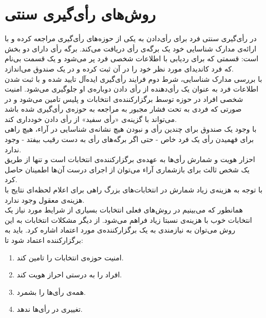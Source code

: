 \section{روش‌های رأی‌گیری سنتی}
\par
در رأی‌گیری سنتی فرد برای رأی‌دادن به یکی از ‌‌حوزه‌های رأی‌گیری مراجعه کرده و با ارائه‌ی مدارک شناسایی خود یک برگه‌ی رأی دریافت می‌کند. برگه رأی دارای دو بخش است: قسمتی که برای ردیابی با اطلاعات شخصی فرد پر می‌شود و یک قسمت بی‌نام که فرد کاندیدای مورد نظر خود را در آن ثبت کرده و در یک صندوق می‌اندازد. 
\\
با بررسی مدارک شناسایی، شرط دوم فرایند رأی‌گیری ایده‌آل تایید شده و با ثبت شدن اطلاعات فرد به عنوان یک رأی‌دهنده از رأی دادن دوباره‌ی او جلوگیری می‌شود. امنیت شخصی افراد در حوزه توسط برگزارکننده‌ی انتخابات و پلیس تامین می‌شود و در صورتی که فردی به تحت فشار مجبور به مراجعه به حوزه‌ی رأی‌گیری شده باشد می‌تواند با گزینه‌ی «رأی‌ سفید» از رأی دادن خودداری کند.
\\
با وجود یک صندوق برای چندین رأی و نبودن هیچ نشانه‌ی شناسایی در آراء، هیچ راهی برای فهمیدن رأی یک فرد خاص - حتی اگر برگه‌های رأی به دست رقیب بیفتد - وجود ندارد. 
\\
احزار هویت و شمارش رأی‌ها به عهده‌ی برگزارکننده‌ی انتخابات است و تنها از طریق یک شخص ثالث برای باز‌شماری آراء می‌توان از اجرای درست آن‌ها اطمینان حاصل کرد.
\\
با توجه به هزینه‌ی زیاد شمارش در انتخابات‌های بزرگ راهی برای اعلام لحظه‌ا‌ی نتایج با هزینه‌ی معقول وجود ندارد.
\\
همانطور که می‌بینیم در روش‌های فعلی انتخابات بسیاری از شرایط مورد نیاز یک انتخابات خوب  با هزینه‌ی نسبتا زیاد فراهم می‌شود. از دیگر مشکلات انتخابات به این روش می‌توان به نیازمندی به یک برگزارکننده‌ی مورد اعتماد اشاره کرد. باید به برگزارکننده اعتماد شود تا: 
\begin{enumerate}
	\item 
	امنیت حوزه‌ی انتخابات را تامین کند.
	\item 
	افراد را به درستی احراز هویت کند.
	\item 
	همه‌ی رأی‌ها را بشمرد.
	\item 
	تغییری در رأی‌ها ندهد.
	
\end{enumerate}
 

